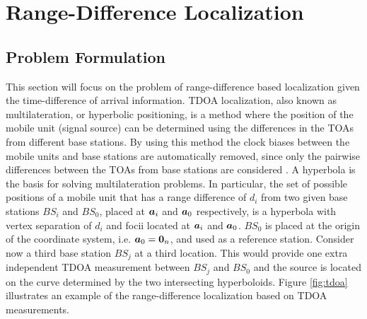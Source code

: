 \newpage

\section{Range-Difference Localization}

\subsection{Problem Formulation}


This section will focus on the problem of range-difference based localization given the time-difference of arrival information. TDOA localization, also known as multilateration, or hyperbolic positioning, is a method where the position of the mobile unit (signal source) can be determined using the differences in the TOAs from different base stations. By using this method the clock biases between the mobile units and base stations are automatically removed, since only the pairwise differences between the TOAs from base stations are  considered \cite{LocAlg}.  A hyperbola is the basis for solving multilateration problems. In particular, the set of possible positions of a mobile unit that has a range difference of $d_i$ from two given base stations $BS_i$ and $BS_0$, placed at $\mbox{\boldmath$a$}_i$ and $\mbox{\boldmath$a$}_0$ respectively, is a hyperbola with vertex separation of $d_i$ and focii located at $\mbox{\boldmath$a$}_i$ and $\mbox{\boldmath$a$}_0$. $BS_0$ is placed at the origin of the coordinate system, i.e. $\mbox{\boldmath$a$}_0 = \mbox{\boldmath${0}$}_n$, and used as a reference station. Consider now a third base station $BS_j$ at a third location. This would provide one extra independent TDOA measurement between $BS_j$ and $BS_0$ and the source is located on the curve determined by the two intersecting hyperboloids. Figure \ref{fig:tdoa} illustrates an example of the range-difference localization based on TDOA measurements.


